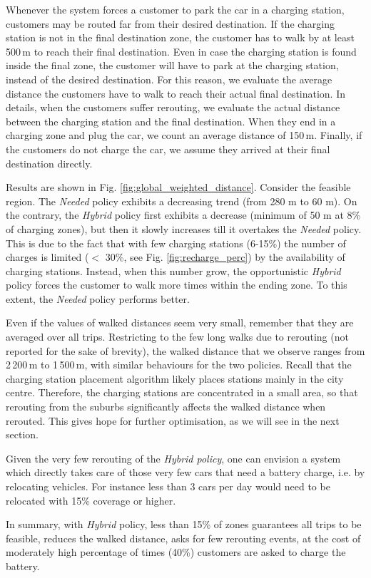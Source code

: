 Whenever the system forces a customer to park the car in a charging station, customers may be routed far from their desired destination. If the charging station is not in the final destination zone, the customer has to walk by at least 500\,m to reach their final destination. Even in case the charging station is found inside the final zone, the customer will have to park at the charging station, instead of the desired destination. 
For this reason, we evaluate the average distance the customers have to walk to reach their actual final destination. 
In details, when the customers suffer rerouting, we evaluate the actual distance between the charging station and the final destination. When they end in a charging zone and plug the car, we count an average distance of 150\,m. Finally, if the customers do not charge the car, we assume they arrived at their final destination directly.

Results are shown in Fig. \ref{fig:global_weighted_distance}.
Consider the feasible region. The \textit{Needed} policy exhibits a decreasing trend (from 280 m to 60 m). On the contrary, the \textit{Hybrid} policy first exhibits a decrease (minimum of 50 m at 8\% of charging zones), but then it slowly increases till it overtakes the \textit{Needed} policy. 
This is due to the fact that with few charging stations (6-15\%) the number of charges is limited ($<$ 30\%, see Fig. \ref{fig:recharge_perc}) by the availability of charging stations. Instead, when this number grow, the opportunistic \textit{Hybrid} policy 
forces the customer to walk more times within the ending zone.
To this extent, the \textit{Needed} policy performs better. 

Even if the values of walked distances seem very small, remember that they are averaged over all trips. Restricting to the few long walks due to rerouting (not reported for the sake of brevity), the walked distance that we observe ranges from 2\,200\,m to 1\,500\,m, with similar behaviours for the two policies. 
Recall that the charging station placement algorithm likely places stations mainly in the city centre. Therefore, the charging stations are concentrated in a small area, so that rerouting from the suburbs significantly affects the walked distance when rerouted. This gives hope for further optimisation, as we will see in the next section.

Given the very few rerouting of the \textit{Hybrid policy}, one can envision a system which directly takes care of those very few cars that need a battery charge, i.e. by relocating vehicles. For instance less than 3 cars per day would need to be relocated with 15\% coverage or higher.

In summary, with \textit{Hybrid} policy, less than 15\% of zones guarantees all trips to be feasible, reduces the walked distance, asks for few rerouting events, at the cost of moderately high percentage of times (40\%) customers are asked to charge the battery.




